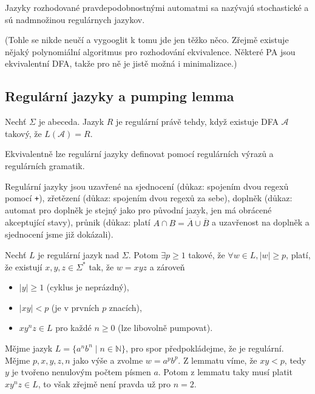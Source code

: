 Jazyky rozhodované pravdepodobnostnými automatmi sa nazývajú stochastické
a sú nadmnožinou regulárnych jazykov.


(Tohle se nikde neučí a vygooglit k tomu jde jen těžko něco. Zřejmě
existuje nějaký polynomiální algoritmus pro rozhodování ekvivalence.
Některé PA jsou ekvivalentní DFA, takže pro ně je jistě možná i
minimalizace.)

\subsection{Regulární jazyky a pumping lemma}

\begin{definition}
Nechť $\Sigma$ je abeceda. Jazyk $R$ je regulární právě tehdy, když
existuje DFA $\mathcal{A}$ takový, že $L(\mathcal{A}) = R$.
\end{definition}

Ekvivalentně lze regulární jazyky definovat pomocí regulárních výrazů a
regulárních gramatik.

Regulární jazyky jsou uzavřené na sjednocení (důkaz: spojením
dvou regexů pomocí \verb|+|), zřetězení (důkaz: spojením dvou
regexů za sebe), doplněk (důkaz: automat pro doplněk je stejný
jako pro původní jazyk, jen má obrácené akceptující stavy), průnik
(důkaz: platí $A \cap B = \overline{\overline{A} \cup \overline{B}}$ a
uzavřenost na doplněk a sjednocení jsme již dokázali).

\begin{theorem}
Nechť $L$ je regulární jazyk nad $\Sigma$.
Potom
$\exists p \geq 1$ takové,
že $\forall w \in L, \lvert w \rvert \geq p$,
platí, že existují $x,y,z \in \Sigma^*$ tak, že $w = xyz$ a zároveň

\begin{itemize}
    \item $\lvert y \rvert \geq 1$ (cyklus je neprázdný),
    \item $\lvert xy \rvert < p$ (je v prvních $p$ znacích),
    \item $xy^nz \in L$ pro každé $n \geq 0$ (lze libovolně pumpovat).
\end{itemize}
\end{theorem}

\begin{example}
    Mějme jazyk $L = \{ a^n b^n \mid n \in \mathbb{N} \}$,
    pro spor předpokládejme, že je regulární.
    Mějme $p,x,y,z,n$ jako výše a zvolme $w = a^p b^p$.
    Z lemmatu víme, že $xy < p$, tedy $y$ je tvořeno nenulovým počtem
    písmen $a$.  Potom z lemmatu taky musí platit $xy^nz \in L$, to však
    zřejmě není pravda už pro $n = 2$.
\end{example}

